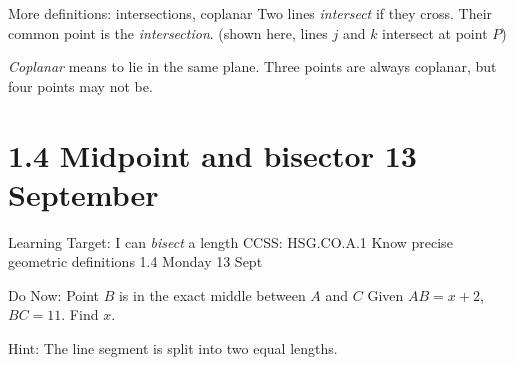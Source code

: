 \begin{frame}{More definitions: intersections, coplanar}
Two lines \emph{intersect} if they cross. Their common point is the \emph{intersection}. 
(shown here, lines $j$ and $k$ intersect at point $P$)
\begin{center}
  \end{center}
  \emph{Coplanar} means to lie in the same plane. Three points are always coplanar, but four points may not be.
  \begin{center}
\end{center}
\end{frame}

\section{1.4 Midpoint and bisector \hfill 13 September}
\begin{frame}{Learning Target: I can \emph{bisect} a length}
  {CCSS: HSG.CO.A.1 Know precise geometric definitions  \hfill \alert{1.4 Monday 13 Sept}}
  
    \begin{block}{Do Now: Point $B$ is in the exact middle between $A$ and $C$}
      Given $AB=x+2$, $BC=11$. Find $x$.
        \begin{center}
        \end{center}
    \end{block}
    Hint: The line segment is split into two equal lengths. \vspace{3cm}
  \end{frame}

